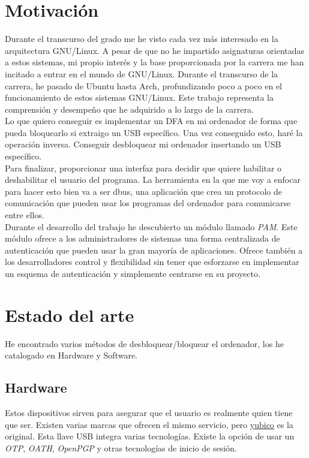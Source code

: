 \documentclass[titlepage]{article}
\begin{document}
\section{Motivación}
Durante el transcurso del grado me he visto cada vez más interesado en la arquitectura \Gls{GNU/Linux}. A pesar de que no he impartido asignaturas orientadas a estos sistemas, mi propio interés y la base proporcionada por la carrera me han incitado a entrar en el mundo de GNU/Linux. Durante el transcurso de la carrera, he pasado de Ubuntu hasta Arch, profundizando poco a poco en el funcionamiento de estos sistemas GNU/Linux. Este trabajo representa la comprensión y desempeño que he adquirido a lo largo de la carrera.\\Lo que quiero conseguir es implementar un \Gls{DFA} en mi ordenador de forma que pueda bloquearlo si extraigo un USB específico. Una vez conseguido esto, haré la operación inversa. Conseguir desbloquear mi ordenador insertando un USB específico.\\Para finalizar, proporcionar una interfaz para decidir que quiere habilitar o deshabilitar el usuario del programa. La herramienta en la que me voy a enfocar para hacer esto bien va a ser dbus, una aplicación que crea un protocolo de comunicación que pueden usar los programas del ordenador para comunicarse entre ellos.\\Durante el desarrollo del trabajo he descubierto un módulo llamado \textit{\Gls{PAM}}. Este módulo ofrece a los administradores de sistemas una forma centralizada de autenticación que pueden usar la gran mayoría de aplicaciones. Ofrece también a los desarrolladores control y flexibilidad sin tener que esforzarse en implementar un esquema de autenticación y simplemente centrarse en su proyecto.
\section{Estado del arte}
He encontrado varios métodos de desbloquear/bloquear el ordenador, los he catalogado en Hardware y Software.
\subsection{Hardware}
Estos dispositivos sirven para asegurar que el usuario es realmente quien tiene que ser. Existen varias marcas que ofrecen el mismo servicio, pero \href{https://www.yubico.com/why-yubico/for-individuals/}{yubico} es la original.
Esta llave USB integra varias tecnologías. Existe la opción de usar un \textit{\Gls{OTP}}, \textit{\Gls{OATH}}, \textit{\Gls{OpenPGP}} y otras tecnologías de inicio de sesión.
\end{document}
